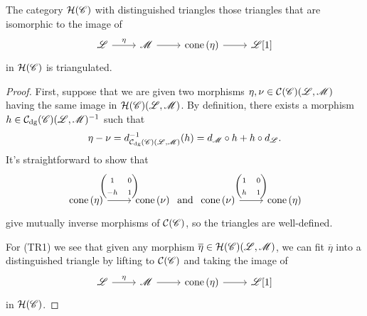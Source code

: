 \documentclass[dissertation.tex]{subfiles}
\begin{document}
        \begin{prop}
          The category $\mathcal{H}(\mathscr{C})$ with distinguished triangles those triangles that are isomorphic to the image of
          $$\begin{tikzcd}
            \mathscr{L} \arrow{r}{\eta} & \mathscr{M} \arrow{r} & \cone{\eta} \arrow{r} & \mathscr{L}[1] 
          \end{tikzcd}$$
          in $\mathcal{H}(\mathscr{C})$ is triangulated.

          \begin{proof}
            First, suppose that we are given two morphisms $\eta, \nu \in \mathcal{C}(\mathscr{C})(\mathscr{L},\mathscr{M})$ having the same image in $\mathcal{H}(\mathscr{C})(\mathscr{L},\mathscr{M})$.
            By definition, there exists a morphism $h \in \mathcal{C}_\text{dg}(\mathscr{C})(\mathscr{L},\mathscr{M})^{-1}$ such that 
            $$\eta - \nu = d_{\mathcal{C}_\text{dg}(\mathscr{C})(\mathscr{L},\mathscr{M})}^{-1}(h) = d_\mathscr{M} \circ h + h \circ d_\mathscr{L}.$$
            It's straightforward to show that
            $$\begin{tikzcd}[ampersand replacement=\&]
              \cone{\eta} \arrow{r}{\left(\begin{matrix}1 & 0\\-h & 1\end{matrix}\right)} \& \cone{\nu}
            \end{tikzcd}
            \ \text{and}\ 
            \begin{tikzcd}[ampersand replacement=\&]
              \cone{\nu} \arrow{r}{\left(\begin{matrix}1 & 0\\h & 1\end{matrix}\right)} \& \cone{\eta}
            \end{tikzcd}$$
            give mutually inverse morphisms of $\mathcal{C}(\mathscr{C})$, so the triangles are well-defined.
            
            For (TR1) we see that given any morphism $\overline{\eta} \in \mathcal{H}(\mathscr{C})(\mathscr{L},\mathscr{M})$, we can fit $\overline{\eta}$ into a distinguished triangle by lifting to $\mathcal{C}(\mathscr{C})$ and taking the image of
            $$\begin{tikzcd}
              \mathscr{L} \arrow{r}{\eta} & \mathscr{M} \arrow{r} & \cone{\eta} \arrow{r} & \mathscr{L}[1]
            \end{tikzcd}$$
            in $\mathcal{H}(\mathscr{C})$.
          \end{proof}
        \end{prop}
\end{document}
